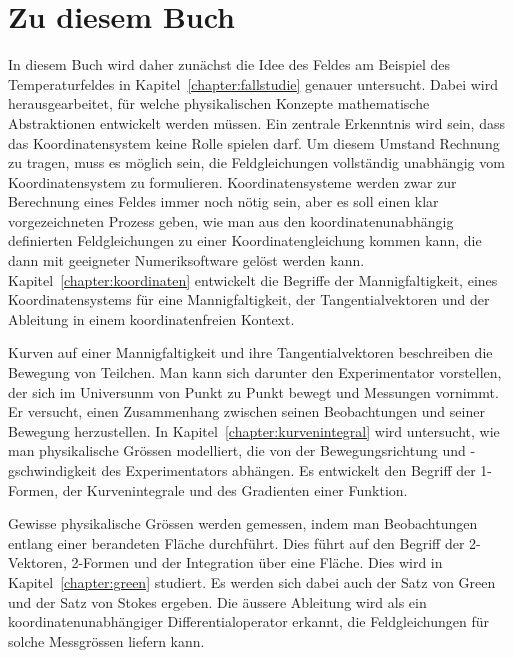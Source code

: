 %
%
%
\section{Zu diesem Buch}
In diesem Buch wird daher zunächst die Idee des Feldes am 
Beispiel des Temperaturfeldes in Kapitel~\ref{chapter:fallstudie}
genauer untersucht.
Dabei wird herausgearbeitet, für welche physikalischen Konzepte
mathematische Abstraktionen entwickelt werden müssen.
Ein zentrale Erkenntnis wird sein, dass das Koordinatensystem keine
Rolle spielen darf.
Um diesem Umstand Rechnung zu tragen, muss es möglich sein, die
Feldgleichungen vollständig unabhängig vom Koordinatensystem
zu formulieren.
%
Koordinatensysteme werden zwar zur Berechnung eines Feldes immer
noch nötig sein, aber es soll einen klar vorgezeichneten Prozess
geben, wie man aus den koordinatenunabhängig definierten Feldgleichungen
zu einer Koordinatengleichung kommen kann, die dann mit geeigneter
Numeriksoftware gelöst werden kann.
Kapitel~\ref{chapter:koordinaten} entwickelt die Begriffe der
Mannigfaltigkeit, eines Koordinatensystems für eine Mannigfaltigkeit,
der Tangentialvektoren und der Ableitung in einem koordinatenfreien
Kontext.

Kurven auf einer Mannigfaltigkeit und ihre Tangentialvektoren 
beschreiben die Bewegung von Teilchen.
%
%
Man kann sich darunter den Experimentator vorstellen, der sich
im Universunm von Punkt zu Punkt bewegt und Messungen vornimmt.
Er versucht, einen Zusammenhang zwischen seinen Beobachtungen
und seiner Bewegung herzustellen.
In Kapitel~\ref{chapter:kurvenintegral} wird untersucht, wie man
physikalische Grössen modelliert, die von der Bewegungsrichtung
und -gschwindigkeit des Experimentators abhängen.
Es entwickelt den Begriff der 1-Formen, der Kurvenintegrale und
des Gradienten einer Funktion.
%
%

Gewisse physikalische Grössen werden gemessen, indem man Beobachtungen
entlang einer berandeten Fläche durchführt.
Dies führt auf den Begriff der 2-Vektoren, 2-Formen und der Integration
über eine Fläche.
%
%
Dies wird in Kapitel~\ref{chapter:green} studiert.
Es werden sich dabei auch der Satz von Green und der Satz von Stokes
%
%
ergeben.
Die äussere Ableitung wird als ein koordinatenunabhängiger
Differentialoperator erkannt, die Feldgleichungen für solche
Messgrössen liefern kann.

